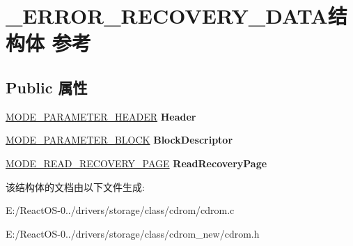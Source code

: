 \hypertarget{struct___e_r_r_o_r___r_e_c_o_v_e_r_y___d_a_t_a}{}\section{\+\_\+\+E\+R\+R\+O\+R\+\_\+\+R\+E\+C\+O\+V\+E\+R\+Y\+\_\+\+D\+A\+T\+A结构体 参考}
\label{struct___e_r_r_o_r___r_e_c_o_v_e_r_y___d_a_t_a}
\subsection*{Public 属性}
\begin{DoxyCompactItemize}
\item 
\mbox{\label{struct___e_r_r_o_r___r_e_c_o_v_e_r_y___d_a_t_a_aa2753b321ded8928a62ca3e8c330f6aa}} 
\hyperlink{struct___m_o_d_e___p_a_r_a_m_e_t_e_r___h_e_a_d_e_r}{M\+O\+D\+E\+\_\+\+P\+A\+R\+A\+M\+E\+T\+E\+R\+\_\+\+H\+E\+A\+D\+ER} {\bfseries Header}
\item 
\mbox{\label{struct___e_r_r_o_r___r_e_c_o_v_e_r_y___d_a_t_a_a4b161a17f7727f31c76e1ee686675bd3}} 
\hyperlink{struct___m_o_d_e___p_a_r_a_m_e_t_e_r___b_l_o_c_k}{M\+O\+D\+E\+\_\+\+P\+A\+R\+A\+M\+E\+T\+E\+R\+\_\+\+B\+L\+O\+CK} {\bfseries Block\+Descriptor}
\item 
\mbox{\label{struct___e_r_r_o_r___r_e_c_o_v_e_r_y___d_a_t_a_a08588fbcfe783056b961508c89b50447}} 
\hyperlink{struct___m_o_d_e___r_e_a_d___r_e_c_o_v_e_r_y___p_a_g_e}{M\+O\+D\+E\+\_\+\+R\+E\+A\+D\+\_\+\+R\+E\+C\+O\+V\+E\+R\+Y\+\_\+\+P\+A\+GE} {\bfseries Read\+Recovery\+Page}
\end{DoxyCompactItemize}


该结构体的文档由以下文件生成\+:\begin{DoxyCompactItemize}
\item 
E\+:/\+React\+O\+S-\/0../drivers/storage/class/cdrom/cdrom.\+c\item 
E\+:/\+React\+O\+S-\/0../drivers/storage/class/cdrom\+\_\+new/cdrom.\+h\end{DoxyCompactItemize}

